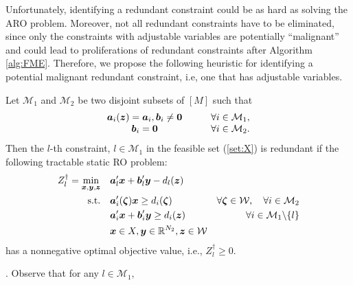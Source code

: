 \documentclass[fleqn,orsc,blindrev]{informs4}
\newcommand{\mb}[1]{\mbox{\boldmath \ensuremath{#1}}}
\renewcommand{\Re}{\mathbb{R}}
\begin{document}
		
		Unfortunately, identifying a redundant constraint could be as hard as solving the ARO problem.  Moreover, not all redundant constraints have to be eliminated,  since only the constraints with adjustable variables are potentially ``malignant''  and could lead to proliferations of redundant constraints after  Algorithm \ref{alg:FME}. Therefore, we propose the following heuristic for identifying a potential malignant redundant constraint, i.e, one that has adjustable variables.
		\begin{theorem} \label{thm:RCI}
     	Let $\mathcal{M}_1$ and $\mathcal{M}_2$  be two  disjoint subsets of $[M]$ such that 
\begin{equation*}
			\begin{array}{cl}
			\mb{a}_i(\mb{z}) = \mb{a}_i,  \mb{b}_i \neq \mb{0} &\qquad \forall i \in \mathcal{M}_1,\\
			\mb{b}_i = \mb{0} & \qquad \forall i \in \mathcal{M}_2.
			\end{array}
\end{equation*}
			Then the $l$-th constraint, $l \in \mathcal{M}_1$  in the feasible set (\ref{set:X}) is redundant if  the following tractable static RO problem:
\begin{equation} \label{mol:RCI}
				\begin{aligned} 
					Z^\dag_l =	\min_{ \boldsymbol{x} , \boldsymbol{y}, \boldsymbol{z}} \quad & \mb{a}'_l\mb{x}+\mb{b}'_l \mb{y} - d_l(\mb{z})  \\
					{\rm s.t.}  \quad &  \mb{a}'_i(\mb{\zeta})\mb{x} \geq d_i(\mb{\zeta}) &  \forall  \mb{\zeta} \in  \mathcal{W}, \quad \forall i  \in \mathcal{M}_2  \\
					\quad & \mb{a}'_i\mb{x}+\mb{b}'_i \mb{y} \geq d_i(\mb{z})  &  \forall i  \in \mathcal{M}_1 \backslash \{l\} \\
					\quad & \mb{x} \in X , \mb{y} \in \Re^{N_2}, \mb{z} \in \mathcal{W}
				\end{aligned}
\end{equation}
			has a nonnegative optimal objective value, i.e., $ Z^\dag_l\ge 0$.	
		\end{theorem}
		. 
		Observe that for  any $l \in \mathcal{M}_1$,
\end{document}
